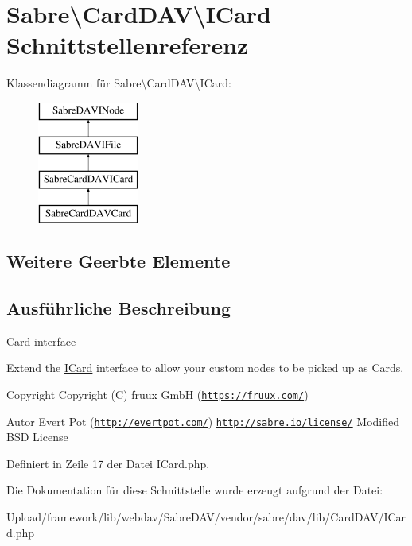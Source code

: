 \hypertarget{interface_sabre_1_1_card_d_a_v_1_1_i_card}{}\section{Sabre\textbackslash{}Card\+D\+AV\textbackslash{}I\+Card Schnittstellenreferenz}
\label{interface_sabre_1_1_card_d_a_v_1_1_i_card}
Klassendiagramm für Sabre\textbackslash{}Card\+D\+AV\textbackslash{}I\+Card\+:\begin{figure}[H]
\begin{center}
\leavevmode
\includegraphics[height=4.000000cm]{interface_sabre_1_1_card_d_a_v_1_1_i_card}
\end{center}
\end{figure}
\subsection*{Weitere Geerbte Elemente}


\subsection{Ausführliche Beschreibung}
\mbox{\hyperlink{class_sabre_1_1_card_d_a_v_1_1_card}{Card}} interface

Extend the \mbox{\hyperlink{interface_sabre_1_1_card_d_a_v_1_1_i_card}{I\+Card}} interface to allow your custom nodes to be picked up as \textquotesingle{}Cards\textquotesingle{}.

\begin{DoxyCopyright}{Copyright}
Copyright (C) fruux GmbH (\href{https://fruux.com/}{\tt https\+://fruux.\+com/}) 
\end{DoxyCopyright}
\begin{DoxyAuthor}{Autor}
Evert Pot (\href{http://evertpot.com/}{\tt http\+://evertpot.\+com/})  \href{http://sabre.io/license/}{\tt http\+://sabre.\+io/license/} Modified B\+SD License 
\end{DoxyAuthor}


Definiert in Zeile 17 der Datei I\+Card.\+php.



Die Dokumentation für diese Schnittstelle wurde erzeugt aufgrund der Datei\+:\begin{DoxyCompactItemize}
\item 
Upload/framework/lib/webdav/\+Sabre\+D\+A\+V/vendor/sabre/dav/lib/\+Card\+D\+A\+V/I\+Card.\+php\end{DoxyCompactItemize}
